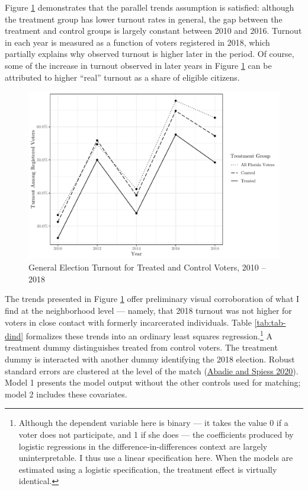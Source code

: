 \documentclass[
  12pt,
]{article}
\begin{document}
Figure \ref{fig:dind} demonstrates that the parallel trends assumption is satisfied: although the treatment group has lower turnout rates in general, the gap between the treatment and control groups is largely constant between 2010 and 2016. Turnout in each year is measured as a function of voters registered in 2018, which partially explains why observed turnout is higher later in the period. Of course, some of the increase in turnout observed in later years in Figure \ref{fig:dind} can be attributed to higher ``real'' turnout as a share of eligible citizens.

\begin{figure}[H]

{\centering \includegraphics{amendment_4_turnout_files/figure-latex/dind-1} 

}

\caption{\label{fig:dind}General Election Turnout for Treated and Control Voters, 2010 -- 2018}\label{fig:dind}
\end{figure}

The trends presented in Figure \ref{fig:dind} offer preliminary visual corroboration of what I find at the neighborhood level --- namely, that 2018 turnout was not higher for voters in close contact with formerly incarcerated individuals. Table \ref{tab:tab-dind} formalizes these trends into an ordinary least squares regression.\footnote{Although the dependent variable here is binary --- it takes the value 0 if a voter does not participate, and 1 if she does --- the coefficients produced by logistic regressions in the difference-in-differences context are largely uninterpretable. I thus use a linear specification here. When the models are estimated using a logistic specification, the treatment effect is virtually identical.} A treatment dummy distinguishes treated from control voters. The treatment dummy is interacted with another dummy identifying the 2018 election. Robust standard errors are clustered at the level of the match (\protect\hyperlink{ref-Abadie2020}{Abadie and Spiess 2020}). Model 1 presents the model output without the other controls used for matching; model 2 includes these covariates.
\end{document}

